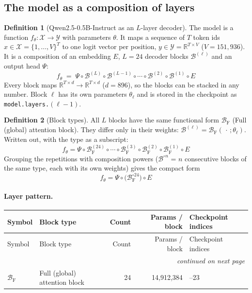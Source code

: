 \documentclass[10pt,a4paper]{article}
\theoremstyle{definition}
\newtheorem{definition}{Definition}[section]
\begin{document}
\subsection{The model as a composition of layers}\label{sec:comp}
\begin{definition}[Qwen2.5-0.5B-Instruct as an $L$-layer decoder]
The model is a function $f_\theta:\mathcal{X}\to\mathcal{Y}$ with parameters $\theta$. It maps a sequence of $T$ token ids $x\in\mathcal{X}=\{1,\dots,V\}^{T}$ to one logit vector per position, $y\in\mathcal{Y}=\mathbb{R}^{T\times V}$ ($V=151{,}936$). It is a composition of an embedding $E$, $L=24$ decoder blocks $\mathcal{B}^{(\ell)}$ and an output head $\Psi$:
\begin{equation}
  f_\theta \;=\; \Psi\circ\mathcal{B}^{(L)}\circ\mathcal{B}^{(L-1)}\circ\cdots\circ\mathcal{B}^{(2)}\circ\mathcal{B}^{(1)}\circ E
\end{equation}
Every block maps $\mathbb{R}^{T\times d}\to\mathbb{R}^{T\times d}$ ($d=896$), so the blocks can be stacked in any number. Block $\ell$ has its own parameters $\theta_\ell$ and is stored in the checkpoint as \texttt{model.layers.}$(\ell-1)$.
\end{definition}
\begin{definition}[Block types]
All $L$ blocks have the same functional form $\mathcal{B}_{\mathrm{F}}$ (Full (global) attention block). They differ only in their weights: $\mathcal{B}^{(\ell)}=\mathcal{B}_{\mathrm{F}}(\,\cdot\,;\theta_\ell)$.
Written out, with the type as a subscript:
\begin{equation}
  f_\theta = \Psi\circ \mathcal{B}^{(24)}_{\mathrm{F}}\circ \cdots\circ \mathcal{B}^{(3)}_{\mathrm{F}}\circ \mathcal{B}^{(2)}_{\mathrm{F}}\circ \mathcal{B}^{(1)}_{\mathrm{F}}\circ E
\end{equation}
Grouping the repetitions with composition powers ($\mathcal{B}^{\circ n}$ = $n$ consecutive blocks of the same type, each with its own weights) gives the compact form
\begin{equation}\label{eq:compact}
  f_\theta = \Psi\circ\Big(\mathcal{B}_{\mathrm{F}}^{\circ 24}\Big)\circ E
\end{equation}
\end{definition}
\paragraph{Layer pattern.}
\begin{longtable}{l>{\raggedright\arraybackslash}p{5.6cm}rr>{\raggedright\arraybackslash}p{4.4cm}}
\toprule
Symbol & Block type & Count & Params / block & Checkpoint indices \\
\midrule
\endfirsthead
\toprule
Symbol & Block type & Count & Params / block & Checkpoint indices \\
\midrule
\endhead
\midrule \multicolumn{5}{r}{\textit{continued on next page}} \\
\endfoot
\bottomrule
\endlastfoot
$\mathcal{B}_{\mathrm{F}}$ & Full (global) attention block & 24 & 14,912,384 & 0--23 \\
\end{longtable}
\end{document}
